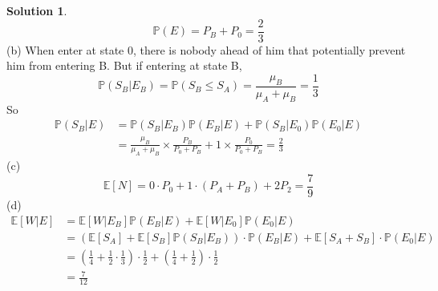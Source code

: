 \documentclass[a4paper, 10pt]{article}
\theoremstyle{definition}
\theoremstyle{hSol}
\newtheorem*{solution}{Solution}
\begin{document}
\begin{solution}
\begin{equation}
  \mathbb{P}\left(E\right) = P_B + P_0 = \frac{2}{3}
\end{equation}
(b) When enter at state 0, there is nobody ahead of him that potentially prevent him from entering B. But if entering at state B, 
$$
\mathbb{P}\left(S_B|E_B\right)=\mathbb{P}\left(S_B \leq S_A\right) = \frac{\mu_B}{\mu_A+\mu_B} = \frac{1}{3}
$$
So
\begin{equation}
  \begin{split}
    \mathbb{P}\left(S_B|E\right) &= \mathbb{P}\left(S_B|E_B\right)\mathbb{P}\left(E_B|E\right) + \mathbb{P}\left(S_B|E_0\right)\mathbb{P}\left(E_0|E\right) \\
    &= \frac{\mu_B}{\mu_A+\mu_B} \times \frac{P_B}{P_0+P_B} + 1 \times \frac{P_0}{P_0+P_B} = \frac{2}{3}
  \end{split}
\end{equation}
(c) 
$$\mathbb{E}\left[N\right] = 0\cdot P_0 + 1\cdot(P_A+P_B)+2P_2 = \frac{7}{9}$$
(d) 
\begin{equation}
  \begin{split}
    \mathbb{E}\left[W|E\right] &= \mathbb{E}\left[W|E_B\right] \mathbb{P}\left(E_B|E\right) + \mathbb{E}\left[W|E_0\right] \mathbb{P}\left(E_0|E\right) \\
    &= \left(\mathbb{E}\left[S_A\right]+\mathbb{E}\left[S_B\right]\mathbb{P}\left(S_B|E_B\right)\right)\cdot\mathbb{P}\left(E_B|E\right)+ \mathbb{E}\left[S_A+S_B\right]\cdot\mathbb{P}\left(E_0|E\right)\\
    &= \left(\frac{1}{4}+\frac{1}{2}\cdot\frac{1}{3}\right)\cdot\frac{1}{2} + \left(\frac{1}{4}+\frac{1}{2}\right)\cdot\frac{1}{2} \\
    &= \frac{7}{12}
  \end{split}
\end{equation}
\end{solution}
\end{document}
